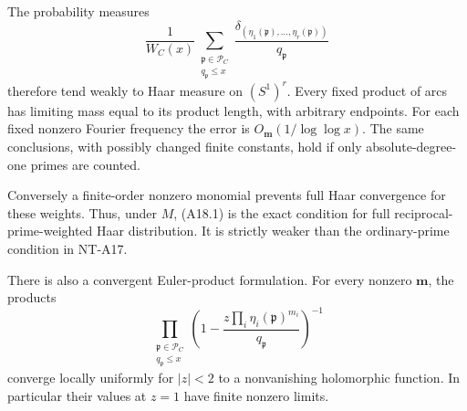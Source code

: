 The probability measures
\[
 \frac1{W_C(x)}
   \sum_{\substack{\mathfrak p\in\mathcal P_C\\q_{\mathfrak p}\le x}}
        \frac{\delta_{(\eta_1(\mathfrak p),\ldots,\eta_r(\mathfrak p))}}
             {q_{\mathfrak p}}
                                                               \tag{A18.4}
\]
therefore tend weakly to Haar measure on \((S^1)^r\).
Every fixed product of arcs has limiting mass equal
to its product length, with arbitrary endpoints.
For each fixed nonzero Fourier frequency the error
is \(O_{\mathbf m}(1/\log\log x)\).
The same conclusions, with possibly changed finite
constants, hold if only absolute-degree-one primes
are counted.

Conversely a finite-order nonzero monomial prevents
full Haar convergence for these weights. Thus, under
\(M\), (A18.1) is the exact condition for full
reciprocal-prime-weighted Haar distribution. It is
strictly weaker than the ordinary-prime condition
in NT-A17.

There is also a convergent Euler-product formulation.
For every nonzero \(\mathbf m\), the products
\[
 \prod_{\substack{\mathfrak p\in\mathcal P_C\\q_{\mathfrak p}\le x}}
 \left(1-\frac{z\prod_i\eta_i(\mathfrak p)^{m_i}}
                    {q_{\mathfrak p}}\right)^{-1}
                                                               \tag{A18.5}
\]
converge locally uniformly for \(|z|<2\) to a
nonvanishing holomorphic function. In particular
their values at \(z=1\) have finite nonzero limits.

